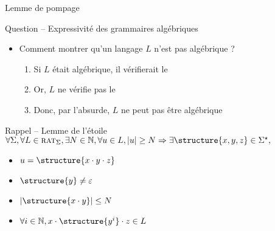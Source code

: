
\begingroup

\begin{frame}{Lemme de pompage}

  \vspace{-5mm}
  \begin{block}{Question -- Expressivité des grammaires algébriques}
    \vspace{-2mm}
    \begin{itemize}
    \item Comment montrer qu'un langage $L$ n'est pas algébrique ? 
      \begin{enumerate}
      \item Si $L$ était algébrique, il vérifierait le  
      \item Or, $L$ ne vérifie pas le  
      \item Donc, par l'absurde, $L$ ne peut pas être algébrique
      \end{enumerate}
    \end{itemize}
  \end{block}
  
  \vspace{-1mm}
  \begin{block}{Rappel -- Lemme de l'étoile}
    \vspace{-1mm}
    $\forall\Sigma, \forall L\in \textsc{rat}_\Sigma, \exists N\in \mathbb{N}, \forall u\in L, |u| \ge N \Rightarrow \exists \structure{x, y, z}\in \Sigma^\star,$

    \vspace{1mm}
    \begin{minipage}{.4\textwidth}
      \begin{itemize}
      \item $u = \structure{x\cdot y \cdot z}$
      \item $\structure{y}\neq \varepsilon$
      \end{itemize}
    \end{minipage}%
    \begin{minipage}{.5\textwidth}
      \begin{itemize}
      \item $|\structure{x\cdot y}| \le N$
      \item $\forall i \in \mathbb{N}, x\cdot \structure{y^i} \cdot z \in L$
      \end{itemize}
    \end{minipage}
  \end{block}


\end{frame}
